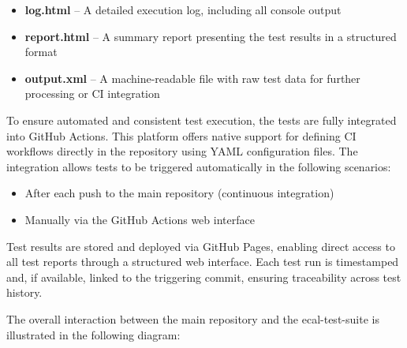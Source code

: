 \begin{itemize}
	\item \textbf{log.html} – A detailed execution log, including all console output
	\item \textbf{report.html} – A summary report presenting the test results in a structured format
	\item \textbf{output.xml} – A machine-readable file with raw test data for further processing or CI integration
\end{itemize}

\vspace{0.9em}
To ensure automated and consistent test execution, the tests are fully integrated into GitHub Actions. This platform offers native support for defining CI workflows directly in the repository using YAML configuration files. The integration allows tests to be triggered automatically in the following scenarios:

\begin{itemize}
	\item After each push to the main repository (continuous integration)
	\item Manually via the GitHub Actions web interface
\end{itemize}

\vspace{0.5em}
Test results are stored and deployed via GitHub Pages, enabling direct access to all test reports through a structured web interface. Each test run is timestamped and, if available, linked to the triggering commit, ensuring traceability across test history.

\vspace{0.5em}
The overall interaction between the main repository and the ecal-test-suite is illustrated in the following diagram:

